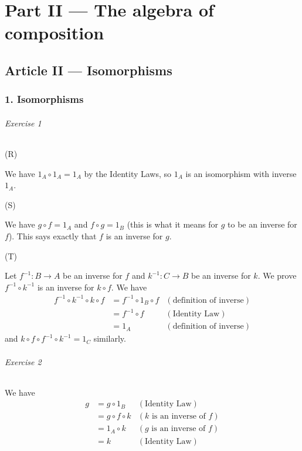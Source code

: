 \documentclass{report}
\newcommand{\inv}[1]{\ensuremath{{#1}^{-1}}}
\begin{document}
    \part{Part II --- The algebra of composition}

    \chapter{Article II --- Isomorphisms}

    \section{1. Isomorphisms}

    \paragraph{Exercise 1}
    \subparagraph{(R)}
    We have $1_A \circ 1_A = 1_A$ by the Identity Laws, so $1_A$ is an isomorphism with inverse $1_A$.

    \subparagraph{(S)}
    We have $g \circ f = 1_A$ and $f \circ g = 1_B$ (this is what it means for $g$ to be an inverse for $f$).
    This says exactly that $f$ is an inverse for $g$.

    \subparagraph{(T)}
    Let $\inv{f} : B \rightarrow A$ be an inverse for $f$ and $\inv{k} : C \rightarrow B$ be an inverse for $k$.
    We prove $\inv{f} \circ \inv{k}$ is an inverse for $k \circ f$. We have
    \begin{align*}
        \inv{f} \circ \inv{k} \circ k \circ f & = \inv{f} \circ 1_B \circ f & (\text{definition of inverse}) \\
        & = \inv{f} \circ f & (\text{Identity Law})\\
        & = 1_A & (\text{definition of inverse})
    \end{align*}
    and $k \circ f \circ \inv{f} \circ \inv{k} = 1_C$ similarly.

    \paragraph{Exercise 2}
    We have
    \begin{align*}
        g & = g \circ 1_B & (\text{Identity Law}) \\
        & = g \circ f \circ k & (\text{$k$ is an inverse of $f$}) \\
        & = 1_A \circ k & (\text{$g$ is an inverse of $f$}) \\
        & = k & (\text{Identity Law})
    \end{align*}
\end{document}
